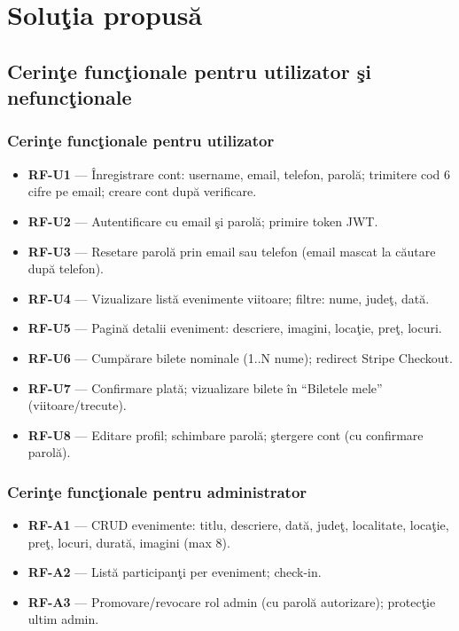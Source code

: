 \chapter{Solu\c tia propus\u a}

\vspace*{-1cm}
\section{Cerin\c te func\c tionale pentru utilizator \c si \newline nefunc\c tionale}

\subsection{Cerin\c te func\c tionale pentru utilizator}

\begin{itemize}
	\item \textbf{RF-U1} --- \^Inregistrare cont: username, email, telefon, parol\u a; trimitere cod 6 cifre pe email; creare cont dup\u a verificare.
	\item \textbf{RF-U2} --- Autentificare cu email \c si parol\u a; primire token JWT.
	\item \textbf{RF-U3} --- Resetare parol\u a prin email sau telefon (email mascat la c\u autare dup\u a telefon).
	\item \textbf{RF-U4} --- Vizualizare list\u a evenimente viitoare; filtre: nume, jude\c t, dat\u a.
	\item \textbf{RF-U5} --- Pagin\u a detalii eveniment: descriere, imagini, loca\c tie, pre\c t, locuri.
	\item \textbf{RF-U6} --- Cump\u arare bilete nominale (1..N nume); redirect Stripe Checkout.
	\item \textbf{RF-U7} --- Confirmare plat\u a; vizualizare bilete \^in ``Biletele mele'' (viitoare/trecute).
	\item \textbf{RF-U8} --- Editare profil; schimbare parol\u a; \c stergere cont (cu confirmare parol\u a).
\end{itemize}

\subsection{Cerin\c te func\c tionale pentru administrator}

\begin{itemize}
	\item \textbf{RF-A1} --- CRUD evenimente: titlu, descriere, dat\u a, jude\c t, localitate, loca\c tie, pre\c t, locuri, durat\u a, imagini (max 8).
	\item \textbf{RF-A2} --- List\u a participan\c ti per eveniment; check-in.
	\item \textbf{RF-A3} --- Promovare/revocare rol admin (cu parol\u a autorizare); protec\c tie ultim admin.
\end{itemize}

